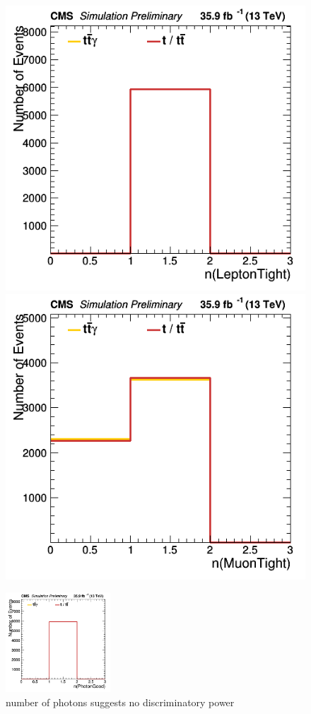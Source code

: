 \documentclass[11pt]{scrartcl}
\begin{document}
	\begin{figure}[H]
	\centering
	\begin{minipage}{.5\textwidth}
	  \centering
	  \includegraphics[width=0.7\linewidth]{figures/Notused/nLeptonTight.png}
	\end{minipage}%
	\begin{minipage}{.5\textwidth}
	  \centering
	  \includegraphics[width=0.7\linewidth]{figures/Notused/nMuonTight.png}
	\end{minipage}
	\end{figure}
	
	\begin{figure}[H]
		\begin{center}
		\includegraphics[width=0.35\textwidth]{figures/Notused/nPhotonGood.png}
		\caption{number of photons suggests no discriminatory power}	
		\end{center}
	\end{figure}
	
\end{document}
